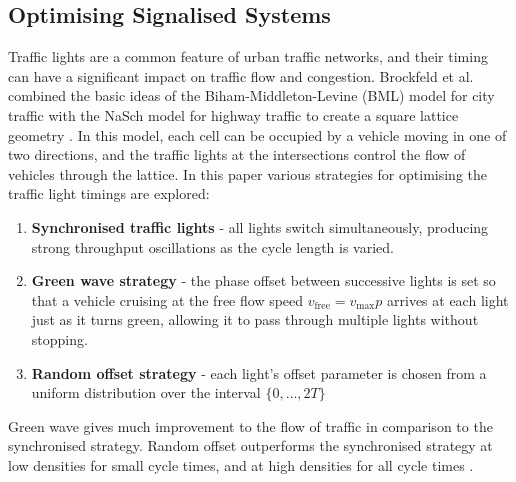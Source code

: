 
\subsection{Optimising Signalised Systems}

Traffic lights are a common feature of urban traffic networks, and their timing can have a significant impact on traffic flow and congestion.
Brockfeld et al. combined the basic ideas of the Biham-Middleton-Levine (BML) model for city traffic with the NaSch model for highway traffic to create a square lattice geometry \cite{brockfeldOptimizingTrafficLights2001}.
In this model, each cell can be occupied by a vehicle moving in one of two directions, and the traffic lights at the intersections control the flow of vehicles through the lattice.
In this paper various strategies for optimising the traffic light timings are explored:

\begin{enumerate}
 \item \textbf{Synchronised traffic lights }- all lights switch simultaneously, producing strong throughput oscillations as the cycle length is varied.
 \item \textbf{Green wave strategy }- the phase offset between successive lights is set so that a vehicle cruising at the free flow speed $v_{\text{free}} = v_{\max}p$ arrives at each light just as it turns green, allowing it to pass through multiple lights without stopping.
 \item \textbf{Random offset strategy }- each light's offset parameter is chosen from a uniform distribution over the interval $\{0,\dots,2T\}$
\end{enumerate}
Green wave gives much improvement to the flow of traffic in comparison to the synchronised strategy.
Random offset outperforms the synchronised strategy at low densities for small cycle times, and at high densities for all cycle times \cite{brockfeldOptimizingTrafficLights2001}.

